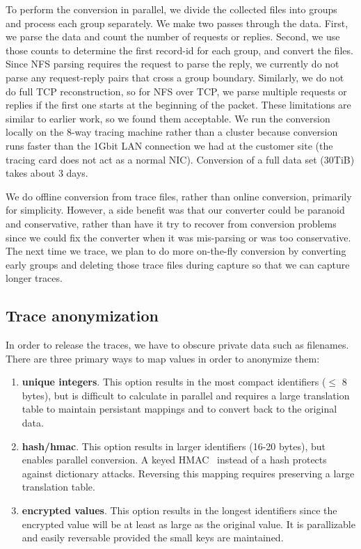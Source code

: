 To perform the conversion in parallel, we divide the collected files
into groups and process each group separately.  We make two passes
through the data.  First, we parse the data and count the number of
requests or replies.  Second, we use those counts to determine the
first record-id for each group, and convert the files.  Since NFS
parsing requires the request to parse the reply, we currently do not
parse any request-reply pairs that cross a group boundary.  Similarly,
we do not do full TCP reconstruction, so for NFS over TCP, we parse
multiple requests or replies if the first one starts at the beginning of the packet.
These limitations are similar to earlier work, so we found
them acceptable.  
We run the conversion locally on the 8-way tracing
machine rather than a cluster because conversion runs faster than the
1Gbit LAN connection we had at the customer site (the tracing card
does not act as a normal NIC).  Conversion of a full data set (30TiB)
takes about 3 days.

We do offline conversion from trace files, rather than online conversion, primarily for simplicity.
However, a side benefit was that our converter could be
paranoid and conservative, rather than have it try to recover from
conversion problems since we could fix the converter when it was
mis-parsing or was too conservative.  The next time we trace, we plan
to do more on-the-fly conversion by converting early groups and
deleting those trace files during capture so that we can capture
longer traces.

\subsection{Trace anonymization}

In order to release the traces, we have to obscure private data such
as filenames.  There are three primary ways to map values in order to
anonymize them:

\begin{enumerate}

\item {\bf unique integers}.  This option results in the
most compact identifiers ($\leq$ 8 bytes), but is difficult to
calculate in parallel and requires a large translation table to
maintain persistant mappings and to convert back to the original data.

\item {\bf hash/hmac}.  This option results in larger identifiers
(16-20 bytes), but enables parallel conversion.  A keyed
HMAC~\cite{Bellare96keyinghash} instead of a hash protects against
dictionary attacks.  Reversing this mapping requires preserving a
large translation table.

\item {\bf encrypted values}.  This option results in
the longest identifiers since the encrypted value will be at least as
large as the original value.  It is parallizable and easily reversable
provided the small keys are maintained.

\end{enumerate}

